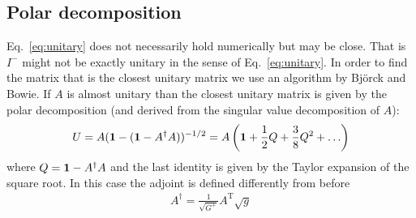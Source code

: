 \subsection{Polar decomposition}
Eq.~\eqref{eq:unitary} does not necessarily hold numerically but may be close.
That is $I^{-}$ might not be exactly unitary in the sense of Eq.~\eqref{eq:unitary}.
In order to find the matrix that is the closest unitary matrix we use an algorithm
by Bj\"orck and Bowie. If $A$ is almost unitary than the closest unitary matrix
is given by the polar decomposition (and derived from the singular value decomposition of $A$):
\begin{align}
    U = A( \mathbf{1} - (\mathbf{1} - A^\dagger A))^{-1/2} = A \left( \mathbf{1} + \frac{1}{2}Q
   +\frac{3}{8}Q^2 + \ldots\right)
\end{align}
where  $Q=\mathbf{1}-A^\dagger A$ and the last identity is given by the Taylor expansion of the square root.
In this case the adjoint is defined differently from before
\begin{align}
    A^\dagger  = \frac{1}{\sqrt{G^+}}A^\mathrm{T}\sqrt{g}
\end{align}


%
%

